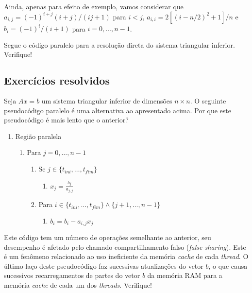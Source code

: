 Ainda, apenas para efeito de exemplo, vamos considerar que $a_{i,j} = (-1)^{i+j}(i+j)/(ij+1)$ para $i<j$, $a_{i,i} = 2[(i-n/2)^2+1]/n$ e $b_i = (-1)^i/(i+1)$ para $i=0,\dotsc,n-1$.

Segue o código paralelo para a resolução direta do sistema triangular inferior. Verifique!



\subsection*{Exercícios resolvidos}

\begin{exeresol}\label{exeresol:mp_sistria_1drow}
  Seja $Ax = b$ um sistema triangular inferior de dimensões $n\times n$. O seguinte pseudocódigo paralelo é uma alternativa ao apresentado acima. Por que este pseudocódigo é mais lento que o anterior?
  \begin{enumerate}
  \item Região paralela
    \begin{enumerate}
    \item Para $j = 0,\dotsc,n-1$
      \begin{enumerate}
      \item Se $j\in\{t_{ini},\dotsc,t_{fim}\}$
        \begin{enumerate}
        \item $\displaystyle x_j = \frac{b_j}{a_{j,j}}$
        \end{enumerate}
      \item Para $i\in\{t_{ini},\dotsc,t_{fim}\}\land\{j+1,\dotsc,n-1\}$
        \begin{enumerate}
        \item $b_i = b_i - a_{i,j}x_j$
        \end{enumerate}
      \end{enumerate}
    \end{enumerate}
  \end{enumerate}
\end{exeresol}
\begin{resol}
  Este código tem um número de operações semelhante ao anterior, seu desempenho é afetado pelo chamado compartilhamento falso ({\it false sharing}). Este é um fenômeno relacionado ao uso ineficiente da memória {\it cache} de cada {\it thread}. O último laço deste pseudocódigo faz sucessivas atualizações do vetor $b$, o que causa sucessivos recarregamentos de partes do vetor $b$ da memória RAM para a memória {\it cache} de cada um dos {\it threads}. Verifique!
\end{resol}

